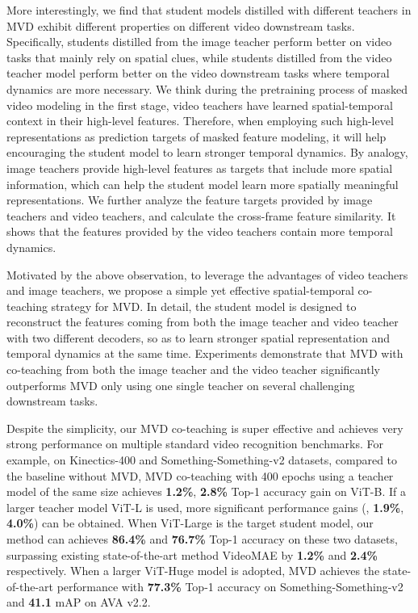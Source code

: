 \documentclass[10pt,twocolumn,letterpaper]{article}
\begin{document}
More interestingly, we find that student models distilled with different teachers in MVD exhibit different properties on different video downstream tasks. Specifically, students distilled from the image teacher perform better on video tasks that mainly rely on spatial clues, while students distilled from the video teacher model perform better on the video downstream tasks where temporal dynamics are more necessary. We think during the pretraining process of masked video modeling in the first stage, video teachers have learned spatial-temporal context in their high-level features. Therefore, when employing such high-level representations as prediction targets of masked feature modeling, it will help encouraging the student model to learn stronger temporal dynamics. By analogy, image teachers provide high-level features as targets that include more spatial information, which can help the student model learn more spatially meaningful representations.
We further analyze the feature targets provided by image teachers and video teachers, and calculate the cross-frame feature similarity. It shows that the features provided by the video teachers contain more temporal dynamics.

Motivated by the above observation, to leverage the advantages of video teachers and image teachers, we propose a simple yet effective spatial-temporal co-teaching strategy for MVD. In detail, the student model is designed to reconstruct the features coming from both the image teacher and video teacher with two different decoders, so as to learn stronger spatial representation and temporal dynamics at the same time. Experiments demonstrate that MVD with co-teaching from both the image teacher and the video teacher significantly outperforms MVD only using one single teacher on several challenging downstream tasks.

Despite the simplicity, our MVD co-teaching is super effective and achieves very strong performance on multiple standard video recognition benchmarks. For example, on Kinectics-400 and Something-Something-v2 datasets, compared to the baseline without MVD,  MVD co-teaching with 400 epochs using a teacher model of the same size achieves \textbf{ 1.2\%}, \textbf{2.8\%} Top-1 accuracy gain on ViT-B. If a larger teacher model ViT-L is used, more significant performance gains (\ie, \textbf{1.9\%}, \textbf{4.0\%}) can be obtained. When ViT-Large is the target student model, our method can achieves \textbf{86.4\%} and \textbf{76.7\%} Top-1 accuracy on these two datasets, surpassing existing state-of-the-art method VideoMAE \cite{tong2022videomae} by \textbf{1.2\%} and \textbf{2.4\%} respectively. When a larger ViT-Huge model is adopted, MVD achieves the state-of-the-art performance with \textbf{77.3\%} Top-1 accuracy on Something-Something-v2 and \textbf{41.1} mAP on AVA v2.2.
\end{document}
